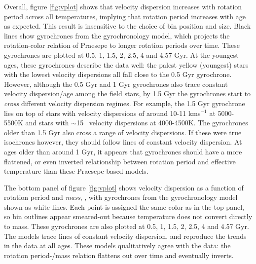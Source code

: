 Overall, figure \ref{fig:vplot} shows that velocity dispersion increases with
rotation period across all temperatures, implying that rotation period
increases with age as expected.
This result is insensitive to the choice of bin position and size.
Black lines show gyrochrones from the \citet{angus2019} gyrochronology model,
which projects the rotation-color relation of Praesepe to longer rotation
periods over time.
These gyrochrones are plotted at 0.5, 1, 1.5, 2, 2.5, 4 and 4.57 Gyr.
At the youngest ages, these gyrochrones describe the data well: the palest
yellow (youngest) stars with the lowest velocity dispersions all fall close to
the 0.5 Gyr gyrochrone.
However, although the 0.5 Gyr and 1 Gyr gyrochrones also trace constant
velocity dispersion/age among the field stars, by 1.5 Gyr the gyrochrones
start to {\it cross} different velocity dispersion regimes.
For example, the 1.5 Gyr gyrochrone lies on top of stars with velocity
dispersions of around 10-11 kms$^{-1}$ at 5000-5500K and stars with $\sim$15
\kms\ velocity dispersions at 4000-4500K.
The gyrochrones older than 1.5 Gyr also cross a range of velocity dispersions.
If these were true isochrones however, they should follow lines of constant
velocity dispersion.
At ages older than around 1 Gyr, it appears that gyrochrones should have a more
flattened, or even inverted relationship between rotation period and effective
temperature than these Praesepe-based models.

The bottom panel of figure \ref{fig:vplot} shows velocity dispersion as a
function of rotation period and {\it mass}, \citep[from][]{berger2020}, with
gyrochrones from the \citep{spada2019} gyrochronology model shown as white
lines.
Each point is assigned the same color as in the top panel, so bin outlines
appear smeared-out because temperature does not convert directly to mass.
These gyrochrones are also plotted at 0.5, 1, 1.5, 2, 2.5, 4 and 4.57 Gyr.
The \citet{spada2019} models trace lines of constant velocity dispersion, and
reproduce the trends in the data at all ages.
These models qualitatively agree with the data: the rotation period-\teff/mass
relation flattens out over time and eventually inverts.

